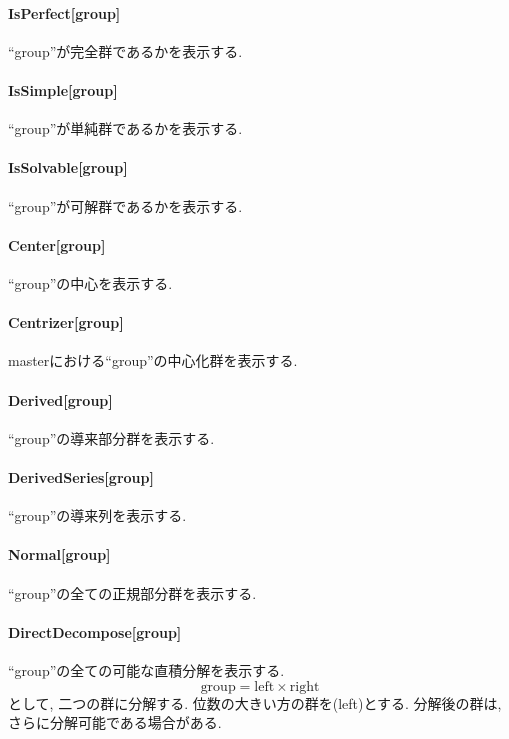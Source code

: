 \documentclass[11pt, a4paper]{jsarticle}
\begin{document}
\paragraph{IsPerfect[group]}
``group''が完全群であるかを表示する.

\paragraph{IsSimple[group]}
``group''が単純群であるかを表示する.

\paragraph{IsSolvable[group]}
``group''が可解群であるかを表示する.

\paragraph{Center[group]}
``group''の中心を表示する.

\paragraph{Centrizer[group]}
masterにおける``group''の中心化群を表示する.

\paragraph{Derived[group]}
``group''の導来部分群を表示する.

\paragraph{DerivedSeries[group]}
``group''の導来列を表示する.

\paragraph{Normal[group]}
``group''の全ての正規部分群を表示する.

\paragraph{DirectDecompose[group]}
``group''の全ての可能な直積分解を表示する.
\begin{equation}
\text{group} = \text{left} \times \text{right}
\end{equation}
として, 二つの群に分解する.
位数の大きい方の群を(left)とする.
分解後の群は, さらに分解可能である場合がある.
\end{document}
